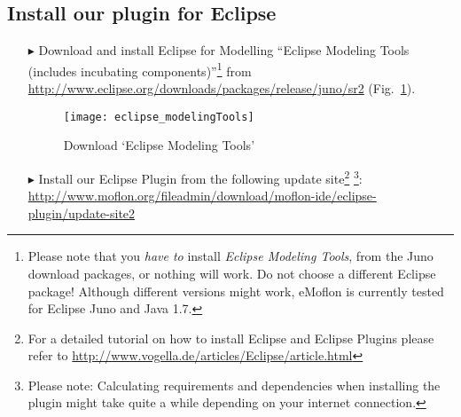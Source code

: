 \genHeader
{}

\subsection{Install our plugin for Eclipse}
 
 \vspace{0.5cm}
 
\begin{itemize}
\item[$\blacktriangleright$] Download\hypertarget{installPlugin common}{} and install Eclipse for Modelling ``Eclipse Modeling Tools (includes incubating components)''\footnote{Please note that you \emph{have to} install \emph{Eclipse Modeling Tools}, from the Juno download packages, or nothing will work.  Do not choose a different Eclipse package!  Although different versions might work, eMoflon is currently tested for Eclipse Juno and Java 1.7.} from \url{http://www.eclipse.org/downloads/packages/release/juno/sr2} (Fig.~\ref{fig_downloadModelingPackage}).

\vspace{1.5cm}

\begin{figure}[htbp]
	\centering
  	\texttt{[image: eclipse\_modelingTools]}
	\caption{Download `Eclipse Modeling Tools'}
	\label{fig_downloadModelingPackage}
\end{figure}

\vspace{1cm}

\item[$\blacktriangleright$] Install our Eclipse Plugin from the following update site\footnote{For a detailed tutorial on how to install Eclipse and Eclipse Plugins please refer to \url{http://www.vogella.de/articles/Eclipse/article.html}} 
\footnote{Please note: Calculating requirements and dependencies when installing the plugin might take quite a while depending on your internet connection.}:
\url{http://www.moflon.org/fileadmin/download/moflon-ide/eclipse-plugin/update-site2}

\end{itemize}
